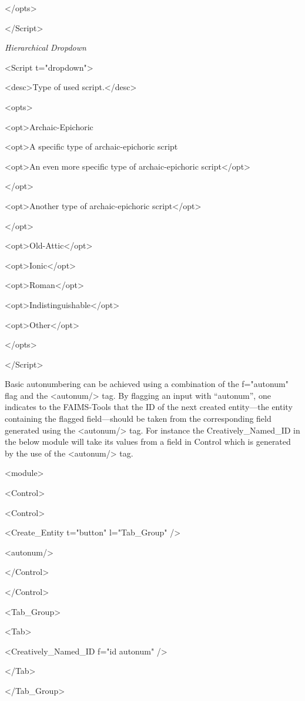 </opts>

</Script>

{\em Hierarchical Dropdown}

<Script t="dropdown">

<desc>Type of used script.</desc>

<opts>

<opt>Archaic-Epichoric

<opt>A specific type of archaic-epichoric script

<opt>An even more specific type of archaic-epichoric script</opt>

</opt>

<opt>Another type of archaic-epichoric script</opt>

</opt>

<opt>Old-Attic</opt>

<opt>Ionic</opt>

<opt>Roman</opt>

<opt>Indistinguishable</opt>

<opt>Other</opt>

</opts>

</Script>



Basic autonumbering can be achieved using a combination of the f="autonum" flag and the <autonum/> tag. By flagging an input with “autonum”, one indicates to the FAIMS-Tools that the ID of the next created entity---the entity containing the flagged field---should be taken from the corresponding field generated using the <autonum/> tag. For instance the Creatively_Named_ID in the below module will take its values from a field in Control which is generated by the use of the <autonum/> tag.

<module>

<Control>

<Control>

<Create_Entity t="button" l="Tab_Group" />

<autonum/>

</Control>

</Control>

<Tab_Group>

<Tab>

<Creatively_Named_ID f="id autonum" />

</Tab>

</Tab_Group>

